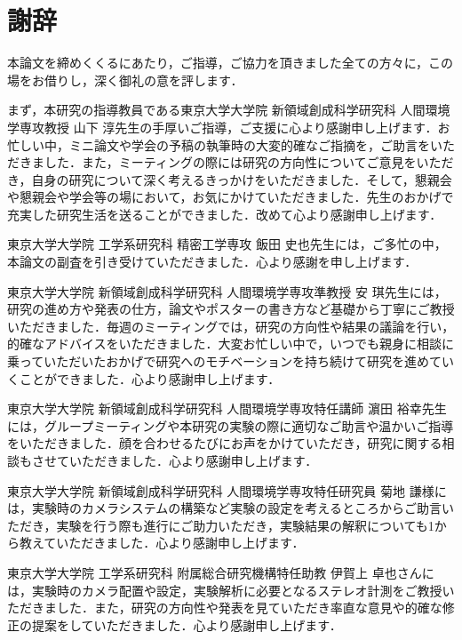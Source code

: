 \documentclass[../main]{subfiles}
\begin{document}
\chapter{謝辞}
\label{thankyou}

\thispagestyle{empty}

\newpage


本論文を締めくくるにあたり，ご指導，ご協力を頂きました全ての方々に，この場をお借りし，深く御礼の意を評します．

まず，本研究の指導教員である東京大学大学院 新領域創成科学研究科 人間環境学専攻教授 山下 淳先生の手厚いご指導，ご支援に心より感謝申し上げます．お忙しい中，ミニ論文や学会の予稿の執筆時の大変的確なご指摘を，ご助言をいただきました．また，ミーティングの際には研究の方向性についてご意見をいただき，自身の研究について深く考えるきっかけをいただきました．そして，懇親会や懇親会や学会等の場において，お気にかけていただきました．先生のおかげで充実した研究生活を送ることができました．改めて心より感謝申し上げます．

東京大学大学院 工学系研究科 精密工学専攻 飯田 史也先生には，ご多忙の中，本論文の副査を引き受けていただきました．心より感謝を申し上げます．

東京大学大学院 新領域創成科学研究科 人間環境学専攻準教授 安 琪先生には，研究の進め方や発表の仕方，論文やポスターの書き方など基礎から丁寧にご教授いただきました．毎週のミーティングでは，研究の方向性や結果の議論を行い，的確なアドバイスをいただきました．大変お忙しい中で，いつでも親身に相談に乗っていただいたおかげで研究へのモチベーションを持ち続けて研究を進めていくことができました．心より感謝申し上げます．

東京大学大学院 新領域創成科学研究科 人間環境学専攻特任講師 濵田 裕幸先生には，グループミーティングや本研究の実験の際に適切なご助言や温かいご指導をいただきました．顔を合わせるたびにお声をかけていただき，研究に関する相談もさせていただきました．心より感謝申し上げます．

東京大学大学院 新領域創成科学研究科 人間環境学専攻特任研究員 菊地 謙様には，実験時のカメラシステムの構築など実験の設定を考えるところからご助言いただき，実験を行う際も進行にご助力いただき，実験結果の解釈についても1から教えていただきました．心より感謝申し上げます．

東京大学大学院 工学系研究科 附属総合研究機構特任助教 伊賀上 卓也さんには，実験時のカメラ配置や設定，実験解析に必要となるステレオ計測をご教授いただきました．また，研究の方向性や発表を見ていただき率直な意見や的確な修正の提案をしていただきました．心より感謝申し上げます．
\end{document}
